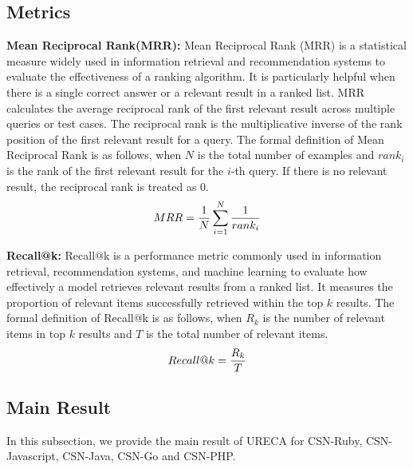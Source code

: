 \subsection{Metrics}
\textbf{Mean Reciprocal Rank(MRR): } 
Mean Reciprocal Rank (MRR) is a statistical measure widely used in information retrieval 
and recommendation systems to evaluate the effectiveness of a ranking algorithm. 
It is particularly helpful when there is a single correct answer or a relevant result in a ranked list.
MRR calculates the average reciprocal rank of the first relevant result across multiple queries or test cases. The reciprocal rank is the multiplicative inverse of the rank position of the first relevant result 
for a query.
The formal definition of Mean Reciprocal Rank is as follows, when $N$ is the total number of examples
and $rank_i$ is  the rank of the first relevant result for the $i$-th query. 
If there is no relevant result, the reciprocal rank is treated as 0.
\begin{align}
    MRR={1 \over N}\sum_{i=1}^N{1 \over rank_i} 
\end{align}

\textbf{Recall@k: }
Recall@k is a performance metric commonly used in information retrieval, recommendation systems, 
and machine learning to evaluate how effectively a model retrieves relevant results from a ranked list. 
It measures the proportion of relevant items successfully retrieved within the top $k$ results.
The formal definition of Recall@k is as follows, when $R_k$ is the number of relevant items in top $k$
results  and $T$ is the total number of relevant items.
\begin{align}
    Recall@k={R_k\over T}
\end{align}

\newpage
\subsection{Main Result}
In this subsection, we provide the main result of URECA for CSN-Ruby, CSN-Javascript, CSN-Java, CSN-Go and 
CSN-PHP. 



